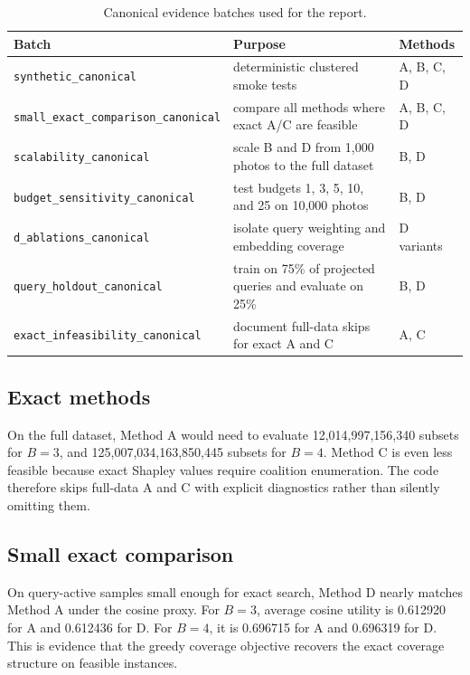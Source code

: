 \documentclass[sigconf,nonacm]{acmart}
\newcommand{\budget}{B}
\begin{document}
\begin{table}[!htbp]
  \centering
  \caption{Canonical evidence batches used for the report.}
  \label{tab:batches}
  \small
  \begin{tabularx}{\textwidth}{@{}lYl@{}}
    \toprule
    Batch & Purpose & Methods \\
    \midrule
    \texttt{synthetic\_canonical} & deterministic clustered smoke tests & A, B, C, D \\
    \texttt{small\_exact\_comparison\_canonical} & compare all methods where exact A/C are feasible & A, B, C, D \\
    \texttt{scalability\_canonical} & scale B and D from 1,000 photos to the full dataset & B, D \\
    \texttt{budget\_sensitivity\_canonical} & test budgets 1, 3, 5, 10, and 25 on 10,000 photos & B, D \\
    \texttt{d\_ablations\_canonical} & isolate query weighting and embedding coverage & D variants \\
    \texttt{query\_holdout\_canonical} & train on 75\% of projected queries and evaluate on 25\% & B, D \\
    \texttt{exact\_infeasibility\_canonical} & document full-data skips for exact A and C & A, C \\
    \bottomrule
  \end{tabularx}
\end{table}

\subsection{Exact methods}
On the full dataset, Method A would need to evaluate 12,014,997,\allowbreak{}156,340 subsets for $\budget=3$, and 125,007,034,\allowbreak{}163,850,\allowbreak{}445 subsets for $\budget=4$. Method C is even less feasible because exact Shapley values require coalition enumeration. The code therefore skips full-data A and C with explicit diagnostics rather than silently omitting them.

\subsection{Small exact comparison}
On query-active samples small enough for exact search, Method D nearly matches Method A under the cosine proxy. For $\budget=3$, average cosine utility is 0.612920 for A and 0.612436 for D. For $\budget=4$, it is 0.696715 for A and 0.696319 for D. This is evidence that the greedy coverage objective recovers the exact coverage structure on feasible instances.
\end{document}
